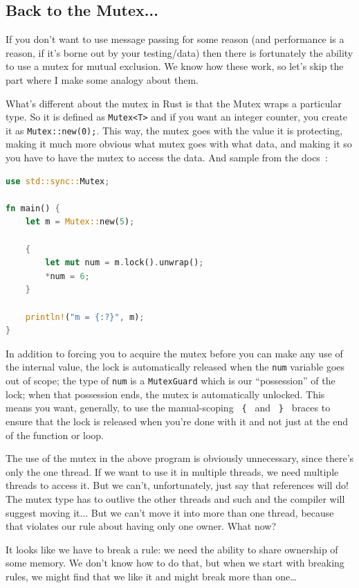 \documentclass[a4paper]{report}
\begin{document}
\subsection*{Back to the Mutex...}
If you don't want to use message passing for some reason (and performance is a reason, if it's borne out by your testing/data) then there is fortunately the ability to use a mutex for mutual exclusion. We know how these work, so let's skip the part where I make some analogy about them. 

What's different about the mutex in Rust is that the Mutex wraps a particular type. So it is defined as \texttt{Mutex<T>} and if you want an integer counter, you create it as \texttt{Mutex::new(0);}. This way, the mutex goes with the value it is protecting, making it much more obvious what mutex goes with what data, and making it so you have to have the mutex to access the data. And sample from the docs~\cite{rustdocs}:

\begin{lstlisting}[language=Rust]
use std::sync::Mutex;

fn main() {
    let m = Mutex::new(5);

    {
        let mut num = m.lock().unwrap();
        *num = 6;
    }

    println!("m = {:?}", m);
}
\end{lstlisting}

In addition to forcing you to acquire the mutex before you can make any use of the internal value, the lock is automatically released when the \texttt{num} variable goes out of scope; the type of \texttt{num} is a \texttt{MutexGuard} which is our ``possession'' of the lock; when that possession ends, the mutex is automatically unlocked. This means you want, generally, to use the manual-scoping \texttt{ \{ } and \texttt{ \} } braces to ensure that the lock is released when you're done with it and not just at the end of the function or loop.

The use of the mutex in the above program is obviously unnecessary, since there's only the one thread. If we want to use it in multiple threads, we need multiple threads to access it. But we can't, unfortunately, just say that references will do! The mutex type has to outlive the other threads and such and the compiler will suggest moving it... But we can't move it into more than one thread, because that violates our rule about having only one owner. What now?

It looks like we have to break a rule: we need the ability to share ownership of some memory. We don't know how to do that, but when we start with breaking rules, we might find that we like it and might break more than one\ldots
\end{document}

